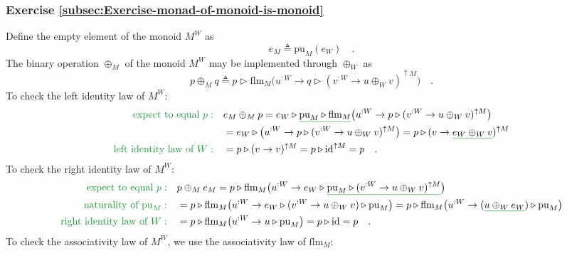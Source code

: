 \subsubsection*{Exercise \ref{subsec:Exercise-monad-of-monoid-is-monoid}}

Define the empty element of the monoid $M^{W}$ as 
\[
e_{M}\triangleq\text{pu}_{M}(e_{W})\quad.
\]
The binary operation $\oplus_{M}$ of the monoid $M^{W}$ may be implemented
through $\oplus_{W}$ as
\[
p\oplus_{M}q\triangleq p\triangleright\text{flm}_{M}\big(u^{:W}\rightarrow q\triangleright(v^{:W}\rightarrow u\oplus_{W}v)^{\uparrow M}\big)\quad.
\]
To check the left identity law of $M^{W}$:
\begin{align*}
{\color{greenunder}\text{expect to equal }p:}\quad & e_{M}\oplus_{M}p=e_{W}\triangleright\gunderline{\text{pu}_{M}\triangleright\text{flm}_{M}}\big(u^{:W}\rightarrow p\triangleright(v^{:W}\rightarrow u\oplus_{W}v)^{\uparrow M}\big)\\
 & =e_{W}\triangleright\big(u^{:W}\rightarrow p\triangleright(v^{:W}\rightarrow u\oplus_{W}v)^{\uparrow M}\big)=p\triangleright(v\rightarrow\gunderline{e_{W}\oplus_{W}v})^{\uparrow M}\\
{\color{greenunder}\text{left identity law of }W:}\quad & =p\triangleright(v\rightarrow v)^{\uparrow M}=p\triangleright\text{id}^{\uparrow M}=p\quad.
\end{align*}
To check the right identity law of $M^{W}$:
\begin{align*}
{\color{greenunder}\text{expect to equal }p:}\quad & p\oplus_{M}e_{M}=p\triangleright\text{flm}_{M}\big(u^{:W}\rightarrow e_{W}\triangleright\gunderline{\text{pu}_{M}\triangleright(v^{:W}\rightarrow u\oplus_{W}v)^{\uparrow M}}\big)\\
{\color{greenunder}\text{naturality of }\text{pu}_{M}:}\quad & =p\triangleright\text{flm}_{M}\big(u^{:W}\rightarrow e_{W}\triangleright(v^{:W}\rightarrow u\oplus_{W}v)\triangleright\text{pu}_{M}\big)=p\triangleright\text{flm}_{M}\big(u^{:W}\rightarrow(\gunderline{u\oplus_{W}e_{W}})\triangleright\text{pu}_{M}\big)\\
{\color{greenunder}\text{right identity law of }W:}\quad & =p\triangleright\text{flm}_{M}\big(u^{:W}\rightarrow u\triangleright\text{pu}_{M}\big)=p\triangleright\text{id}=p\quad.
\end{align*}
To check the associativity law of $M^{W}$, we use the associativity
law of $\text{flm}_{M}$:
